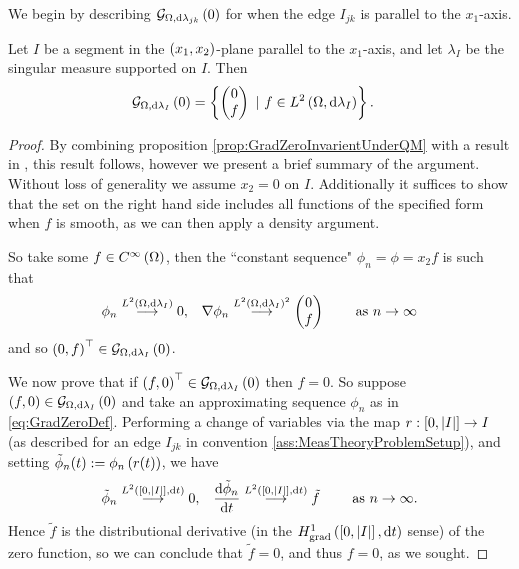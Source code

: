 We begin by describing $\mathcal{G}_{ \Omega, \mathrm{d}\lambda_{jk}}\left( 0 \right)$ for when the edge $I_{jk}$ is parallel to the $x_1$-axis.
\begin{prop} \label{prop:GradZeroParallelZhikov}
	Let $I$ be a segment in the $\left( x_1,x_2 \right)$-plane parallel to the $x_1$-axis, and let $\lambda_I$ be the singular measure supported on $I$.
	Then 
	\begin{align*}
		\mathcal{G}_{ \Omega, \mathrm{d}\lambda_I}\left( 0 \right) &= 
		\left\{ 
			\begin{pmatrix} 0 \\ f	\end{pmatrix}
			\ \vert \ f\in L^{2}\left( \Omega,\mathrm{d}\lambda_I \right)
		 \right\}.
	\end{align*}
\end{prop}
\begin{proof}
	By combining proposition \ref{prop:GradZeroInvarientUnderQM} with a result in \cite{zhikov2000extension} , this result follows, however we present a brief summary of the argument.
	Without loss of generality we assume $x_2=0$ on $I$.
	Additionally it suffices to show that the set on the right hand side includes all functions of the specified form when $f$ is smooth, as we can then apply a density argument. \newline
	
	So take some $f\in C^{\infty}\left( \Omega \right)$, then the ``constant sequence" $\phi_n = \phi = x_2 f$ is such that
	\begin{align*}
		\phi_n\overset{L^{2}\left( \Omega,\mathrm{d}\lambda_I \right)}{\longrightarrow}0, 
		&\quad \nabla\phi_n\overset{L^{2}\left( \Omega,\mathrm{d}\lambda_I \right)^2}{\longrightarrow} \begin{pmatrix} 0 \\ f \end{pmatrix}
		&\quad \ \text{as} \ n \rightarrow\infty
	\end{align*}	 
	and so $\left( 0,f \right)^\top\in\mathcal{G}_{ \Omega, \mathrm{d}\lambda_I}\left( 0 \right)$. \newline
	
	We now prove that if $\left( f,0 \right)^\top\in\mathcal{G}_{ \Omega, \mathrm{d}\lambda_I}\left( 0 \right)$ then $f=0$.
	So suppose $\left( f,0 \right)\in\mathcal{G}_{ \Omega, \mathrm{d}\lambda_I}\left( 0 \right)$ and take an approximating sequence $\phi_n$ as in \eqref{eq:GradZeroDef}.
	Performing a change of variables via the map $r:\left[ 0,\left\lvert I \right\rvert \right]\rightarrow I$ (as described for an edge $I_{jk}$ in convention \ref{ass:MeasTheoryProblemSetup}), and setting $\tilde{\phi}_n(t) := \phi_n\left( r(t) \right)$, we have
	\begin{align*}
		\tilde{\phi}_n\overset{L^{2}\left( \left[ 0,\left\lvert I \right\rvert \right],\mathrm{d}t \right)}{\longrightarrow} 0, 
		&\quad \dfrac{\mathrm{d}\tilde{\phi}_n}{\mathrm{d}t}\overset{L^{2}\left( \left[ 0,\left\lvert I \right\rvert \right],\mathrm{d}t \right)}{\longrightarrow} \tilde{f}
		&\quad \ \text{as} \ n \rightarrow\infty.
	\end{align*}
	Hence $\tilde{f}$ is the distributional derivative (in the $H^1_\mathrm{grad}\left( \left[ 0,\left\lvert I \right\rvert \right], \mathrm{d}t \right)$ sense) of the zero function, so we can conclude that $\tilde{f} = 0$, and thus $f = 0$, as we sought.
\end{proof}

